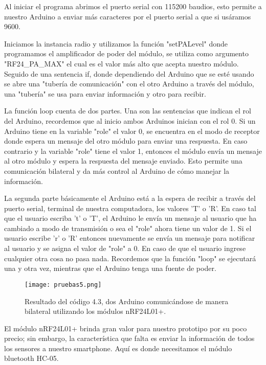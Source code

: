 \par \noindent
Al iniciar el programa abrimos el puerto serial con 115200 baudios, esto permite a nuestro Arduino a enviar más caracteres por el puerto serial a que si usáramos 9600. 

Iniciamos la instancia radio y utilizamos la función "setPALevel" donde programamos el amplificador de poder del módulo, se utiliza como argumento "RF24\_PA\_MAX" el cual es el valor más alto que acepta nuestro módulo. Seguido de una sentencia if, donde dependiendo del Arduino que se esté usando se abre una "tubería de comunicación" con el otro Arduino a través del módulo, una "tubería" se usa para enviar información y otro para recibir.

\par \noindent
La función loop cuenta de dos partes. Una son las sentencias que indican el rol del Arduino, recordemos que al inicio ambos Arduinos inician con el rol 0. Si un Arduino tiene en la variable "role" el valor 0, se encuentra en el modo de receptor donde espera un mensaje del otro módulo para enviar una respuesta. En caso contrario y la variable "role" tiene el valor 1, entonces el módulo envía un mensaje al otro módulo y espera la respuesta del mensaje enviado. Esto permite una comunicación bilateral y da más control al Arduino de cómo manejar la información.

\par \noindent
La segunda parte básicamente el Arduino está a la espera de recibir a través del puerto serial, terminal de nuestra computadora, los valores 'T' o 'R'. En caso tal que el usuario escriba 't' o 'T', el Arduino le envía un mensaje al usuario que ha cambiado a modo de transmisión o sea el "role" ahora tiene un valor de 1. Si el usuario escribe 'r' o 'R' entonces nuevamente se envía un mensaje para notificar al usuario y se asigna el valor de "role" a 0. En caso de que el usuario ingrese cualquier otra cosa no pasa nada. Recordemos que la función "loop" se ejecutará una y otra vez, mientras que el Arduino tenga una fuente de poder.

\begin{figure}[H]
	\centering
	\texttt{[image: pruebas5.png]}
	\caption{Resultado del código 4.3, dos Arduino comunicándose de manera bilateral utilizando los módulos nRF24L01+.}
\end{figure}

\par \noindent
El módulo nRF24L01+ brinda gran valor para nuestro prototipo por su poco precio; sin embargo, la característica que falta es enviar la información de todos los sensores a nuestro smartphone. Aquí es donde necesitamos el módulo bluetooth HC-05.  

